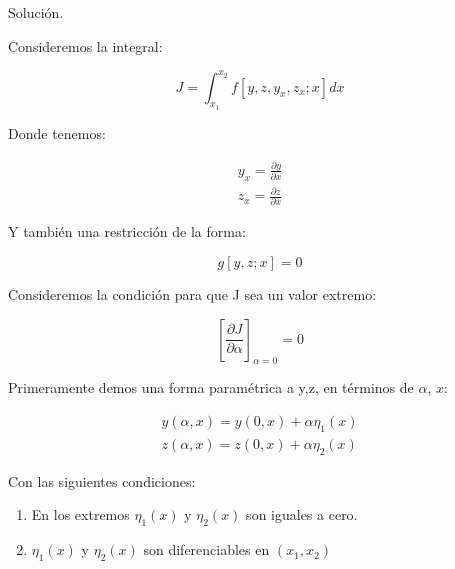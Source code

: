 

\noindent

Solución.

\vspace*{0.5cm}

Consideremos la integral:

\begin{equation}
    J = \int_{x_{1}}^{x_{2}} f\left[ y, z, y_{x}, z_{x}; x \right] dx
\end{equation}

Donde tenemos:

\begin{gather}
    y_{x} = \frac{\partial y}{\partial x} \\
    z_{x} = \frac{\partial z}{\partial x}
\end{gather}

\vspace*{0.5cm}

Y también una restricción de la forma:

\vspace*{0.5cm}

\begin{equation}
    g\left[ y,z;x \right] = 0
\end{equation}

\vspace*{0.5cm}

Consideremos la condición para que J sea un valor extremo:

\vspace*{0.5cm}

\begin{equation}
    \left[ \frac{\partial J}{\partial \alpha} \right]_{\alpha = 0} = 0
\end{equation}

\vspace*{0.5cm}

Primeramente demos una forma paramétrica a y,z, en términos de $\alpha$, $x$:

\begin{gather}
    y(\alpha,x) = y(0,x) + \alpha \eta_{1} (x) \\
    z(\alpha,x) = z(0,x) + \alpha \eta_{2} (x)
\end{gather}

\vspace*{0.5cm}

Con las siguientes condiciones:

\begin{enumerate}
    \item En los extremos $\eta_{1} (x)$ y $\eta_{2} (x)$ son iguales a cero.
    \item $\eta_{1} (x)$ y $\eta_{2} (x)$ son diferenciables en $(x_{1}, x_{2})$
\end{enumerate}

